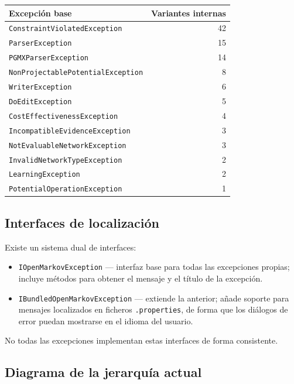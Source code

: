 \documentclass[11pt,a4paper]{article}
\begin{document}
\begin{longtable}{lr}
    \toprule
    \textbf{Excepción base} & \textbf{Variantes internas} \\
    \midrule
    \texttt{ConstraintViolatedException}  & 42 \\
    \texttt{ParserException}              & 15 \\
    \texttt{PGMXParserException}          & 14 \\
    \texttt{NonProjectablePotentialException} & 8 \\
    \texttt{WriterException}              & 6  \\
    \texttt{DoEditException}              & 5  \\
    \texttt{CostEffectivenessException}   & 4  \\
    \texttt{IncompatibleEvidenceException}& 3  \\
    \texttt{NotEvaluableNetworkException} & 3  \\
    \texttt{InvalidNetworkTypeException}  & 2  \\
    \texttt{LearningException}            & 2  \\
    \texttt{PotentialOperationException}  & 1  \\
    \bottomrule
\end{longtable}

\subsection{Interfaces de localización}

Existe un sistema dual de interfaces:

\begin{itemize}
    \item \texttt{IOpenMarkovException} — interfaz base para todas las excepciones propias;
          incluye métodos para obtener el mensaje y el título de la excepción.
    \item \texttt{IBundledOpenMarkovException} — extiende la anterior; añade soporte para
          mensajes localizados en ficheros \texttt{.properties}, de forma que los diálogos de
          error puedan mostrarse en el idioma del usuario.
\end{itemize}

No todas las excepciones implementan estas interfaces de forma consistente.

\subsection{Diagrama de la jerarquía actual}
\end{document}
